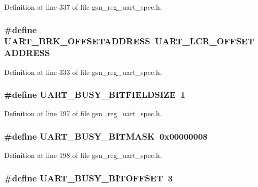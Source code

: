 Definition at line 337 of file gsn\_\-reg\_\-uart\_\-spec.h.

\hypertarget{a00575_a5daf79c9c8570407a784823e329e03e2}{
\subsubsection[{UART\_\-BRK\_\-OFFSETADDRESS}]{\setlength{\rightskip}{0pt plus 5cm}\#define UART\_\-BRK\_\-OFFSETADDRESS~UART\_\-LCR\_\-OFFSETADDRESS}}
\label{a00575_a5daf79c9c8570407a784823e329e03e2}


Definition at line 333 of file gsn\_\-reg\_\-uart\_\-spec.h.

\hypertarget{a00575_af1ce2e82d940bdd21646d4e191b8a5a7}{
\subsubsection[{UART\_\-BUSY\_\-BITFIELDSIZE}]{\setlength{\rightskip}{0pt plus 5cm}\#define UART\_\-BUSY\_\-BITFIELDSIZE~1}}
\label{a00575_af1ce2e82d940bdd21646d4e191b8a5a7}


Definition at line 197 of file gsn\_\-reg\_\-uart\_\-spec.h.

\hypertarget{a00575_aaea49c4dc91614cdcb658f09c62aa2ea}{
\subsubsection[{UART\_\-BUSY\_\-BITMASK}]{\setlength{\rightskip}{0pt plus 5cm}\#define UART\_\-BUSY\_\-BITMASK~0x00000008}}
\label{a00575_aaea49c4dc91614cdcb658f09c62aa2ea}


Definition at line 198 of file gsn\_\-reg\_\-uart\_\-spec.h.

\hypertarget{a00575_a17a3e776ac3be19463d1f6769972f557}{
\subsubsection[{UART\_\-BUSY\_\-BITOFFSET}]{\setlength{\rightskip}{0pt plus 5cm}\#define UART\_\-BUSY\_\-BITOFFSET~3}}
\label{a00575_a17a3e776ac3be19463d1f6769972f557}



